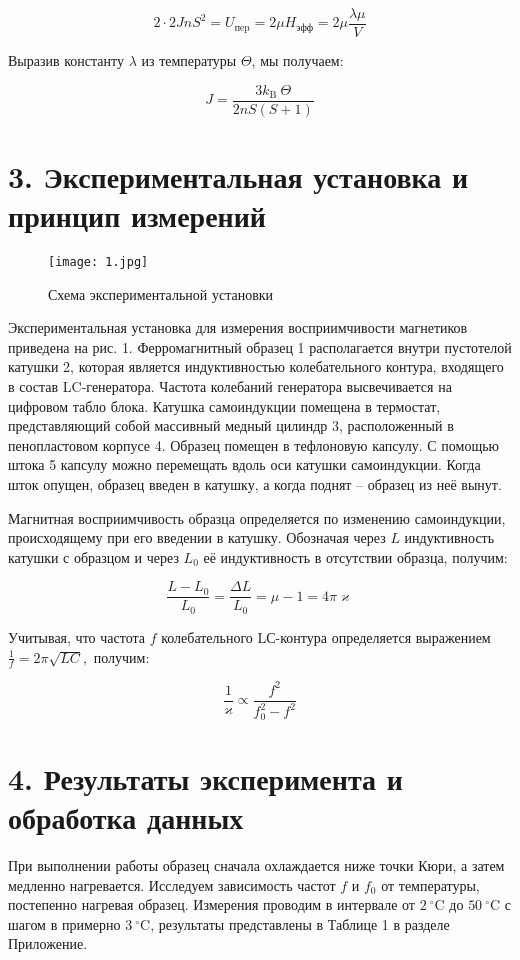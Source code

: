\documentclass[a4paper,12pt]{report}
\begin{document}
$$2\cdot2Jn S^2 = U_{\text{пep}}=2 \mu H_{\text{эфф}} =2 \mu \frac{\lambda \mu}{V}$$

Выразив константу $\lambda$ из температуры $\Theta$, мы получаем:

\begin{equation}\label{obm-int}
    J=\frac{3 k_{\text {B }} \Theta}{2 n S(S+1)}
\end{equation}

\section*{3. Экспериментальная установка и принцип измерений}

\begin{figure}[h!]
\begin{center}
\texttt{[image: 1.jpg]}
\caption{Схема экспериментальной установки}
\end{center}
\end{figure}

Экспериментальная установка для измерения восприимчивости магнетиков приведена на рис. 1.  Ферромагнитный образец 1 располагается внутри пустотелой катушки 2, которая является индуктивностью колебательного контура, входящего в состав LC-генератора. Частота колебаний генератора высвечивается на цифровом табло блока. Катушка самоиндукции помещена в термостат, представляющий собой массивный медный цилиндр 3, расположенный в пенопластовом корпусе 4. Образец помещен в тефлоновую капсулу. С помощью штока 5 капсулу можно перемещать вдоль оси катушки самоиндукции. Когда шток опущен, образец введен в катушку, а когда поднят -- образец из неё вынут.

Магнитная восприимчивость образца определяется по изменению самоиндукции, происходящему при его введении в катушку. Обозначая через $L$ индуктивность катушки с образцом и через $L_0$ её индуктивность в отсутствии образца, получим:

$$ \frac{L-L_{0}}{L_{0}}=\frac{\Delta L}{L_{0}}=\mu-1 = 4 \pi \varkappa$$

Учитывая, что частота $f$ колебательного LС-контура определяется выражением $\frac{1}{f}=2 \pi \sqrt{L C},$ получим:

\begin{equation}\label{dependency}
    \frac{1}{\varkappa} \propto \frac{f^{2}}{f_{0}^{2}-f^{2}}
\end{equation}  
	


\section*{4. Результаты эксперимента и обработка данных}
При выполнении работы образец сначала охлаждается ниже точки Кюри, а затем медленно нагревается. Исследуем зависимость частот $f$ и $f_0$ от температуры, постепенно нагревая образец. Измерения  проводим в интервале от $2~^\circ \text{C}$ до $50~^\circ \text{C}$ с шагом в примерно $3~^\circ \text{C}$, результаты представлены в Таблице 1 в разделе Приложение.
\end{document}
